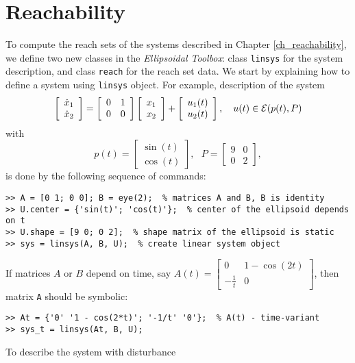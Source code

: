 \section{Reachability}
To compute the reach sets of the systems described
in Chapter \ref{ch_reachability}, we define
two new classes in the {\it Ellipsoidal Toolbox}: class {\tt linsys} for the
system description, and class {\tt reach} for the reach set data.
We start by explaining how to define a system using {\tt linsys} object.
For example, description of the system
\[ \left[\begin{array}{cc}
\dot{x}_1\\
\dot{x}_2\end{array}\right] = \left[\begin{array}{cc}
0 & 1\\
0 & 0\end{array}\right]\left[\begin{array}{c}
x_1\\
x_2\end{array}\right] + \left[\begin{array}{c}
u_1(t)\\
u_2(t)\end{array}\right], ~~~ u(t)\in\EE(p(t), P) \]
with
\[ p(t) = \left[\begin{array}{c}
\sin(t)\\
\cos(t)\end{array}\right], ~~~ P = \left[\begin{array}{cc}
9 & 0\\
0 & 2\end{array}\right], \]
is done by the following sequence of commands:
{\tt \begin{verbatim}
>> A = [0 1; 0 0]; B = eye(2);  % matrices A and B, B is identity
>> U.center = {'sin(t)'; 'cos(t)'};  % center of the ellipsoid depends on t
>> U.shape = [9 0; 0 2];  % shape matrix of the ellipsoid is static
>> sys = linsys(A, B, U);  % create linear system object
\end{verbatim} }
If matrices $A$ or $B$ depend on time, say $A(t)=\left[\begin{array}{cc}
0 & 1-\cos(2t)\\
-\frac{1}{t} & 0\end{array}\right]$, then matrix {\tt A} should be symbolic:
{\tt \begin{verbatim}
>> At = {'0' '1 - cos(2*t)'; '-1/t' '0'};  % A(t) - time-variant
>> sys_t = linsys(At, B, U);
\end{verbatim} }
To describe the system with disturbance
